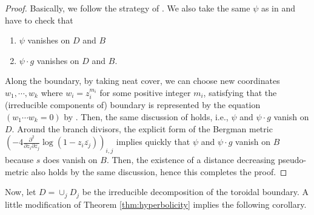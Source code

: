 \documentclass[12pt, pdftex]{amsart}
\theoremstyle{plain}
\theoremstyle{definition}
\numberwithin{equation}{section}
\begin{document}
\begin{proof}
Basically,  we follow the strategy of \cite[Proposition 2.2, 2.3, 2.4]{Ro16}.
We also take the same $\psi$ as in \cite[Section 2]{Ro16} and have to check that
\begin{enumerate}
\item $\psi$ vanishes on $D$ and $B$
\item $\psi\cdot g$ vanishes on $D$ and $B$.
\end{enumerate}
Along the boundary, by taking neat cover, we can choose new coordinates $w_1,\cdots,  w_k$ where $w_i=z_i^{m_i}$ for some positive integer $m_i$, satisfying that the (irreducible components of) boundary is represented by the equation $(w_1\cdots w_k=0)$ by \cite{Mu77}.
Then, the same discussion of \cite[Proposition 2.2, 2.3]{Ro16} holds, i.e., $\psi$ and $\psi\cdot g$ vanish on $D$.
Around the branch divisors, the explicit form of the Bergman metric $(-4\frac{\partial^2}{\partial z_i\partial \overline{z_j}}\log(1-z_i\overline{z_j}))_{i,j}$ implies quickly that $\psi$ and $\psi\cdot g$ vanish on $B$ because $s$ does vanish on $B$.
Then, the existence of a distance decreasing pseudo-metric \cite[Proposition 2.4]{Ro16} also holds by the same discussion, hence this completes the proof.
\end{proof}

Now, let $D=\cup_j D_j$ be the irreducible decomposition of the toroidal boundary.
A little modification of Theorem \ref{thm:hyperbolicity} implies the following corollary.
\end{document}
